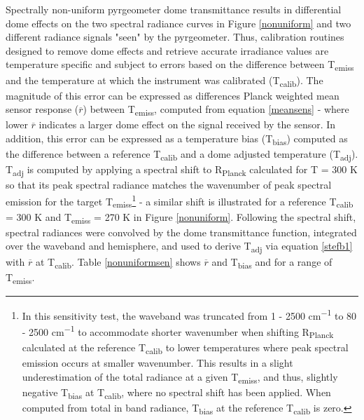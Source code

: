 Spectrally non-uniform pyrgeometer dome transmittance results in differential dome effects on the two spectral radiance curves in Figure \ref{nonuniform} and two different radiance signals "seen" by the pyrgeometer. Thus, calibration routines designed to remove dome effects and retrieve accurate irradiance values are temperature specific and subject to errors based on the difference between T\textsubscript{emiss} and the temperature at which the instrument was calibrated (T\textsubscript{calib}). The magnitude of this error can be expressed as differences Planck weighted mean sensor response ($\overline{r} $) between T\textsubscript{emiss}, computed from equation \ref{meansens} - where lower $\overline{r} $ indicates a larger dome effect on the signal received by the sensor. In addition, this error can be expressed as a temperature bias (T\textsubscript{bias}) computed as the difference between a reference T\textsubscript{calib} and a dome adjusted temperature (T\textsubscript{adj}). T\textsubscript{adj} is computed by applying a spectral shift to R\textsubscript{Planck} calculated for T = 300 \si{\kelvin} so that its peak spectral radiance matches the wavenumber of peak spectral emission for the target T\textsubscript{emiss}\footnote{In this sensitivity test, the waveband was truncated from 1 - 2500 \si{cm^{-1}} to 80 - 2500 \si{cm^{-1}} to accommodate shorter wavenumber when shifting R\textsubscript{Planck} calculated at the reference T\textsubscript{calib} to lower temperatures where peak spectral emission occurs at smaller wavenumber. This results in a slight underestimation of the total radiance at a given T\textsubscript{emiss}, and thus, slightly negative T\textsubscript{bias} at T\textsubscript{calib}, where no spectral shift has been applied. When computed from total in band radiance, T\textsubscript{bias} at the reference T\textsubscript{calib} is zero.} - a similar shift is illustrated for a reference T\textsubscript{calib} = 300 \si{\kelvin} and T\textsubscript{emiss} = 270 \si{\kelvin} in Figure \ref{nonuniform}. Following the spectral shift, spectral radiances were convolved by the dome transmittance function, integrated over the waveband and hemisphere, and used to derive T\textsubscript{adj} via equation \ref{stefb1} with $\overline{r}$ at T\textsubscript{calib}. Table \ref{nonuniformsen} shows $\overline{r}$ and T\textsubscript{bias} and for a range of T\textsubscript{emiss}.

